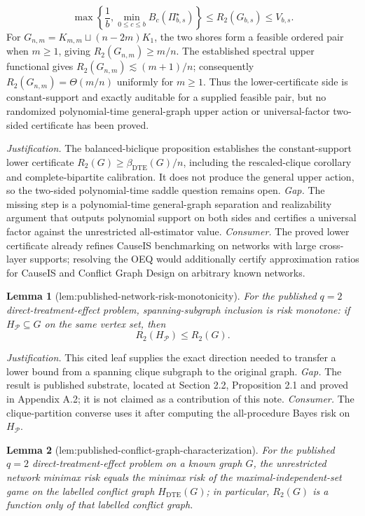 \documentclass{article}
\newtheorem{lemma}{Lemma}
\begin{document}
\[
\max\left\{
\frac1b,
\min_{0\leq c\leq b}B_c(\Pi_{b,s}^{\star})
\right\}
\leq R_2(G_{b,s})\leq V_{b,s}.
\]
For \(G_{n,m}=K_{m,m}\sqcup(n-2m)K_1\), the two shores form a feasible ordered pair when \(m\geq1\), giving \(R_2(G_{n,m})\geq m/n\).  The established spectral upper functional gives \(R_2(G_{n,m})\lesssim(m+1)/n\); consequently \(R_2(G_{n,m})=\Theta(m/n)\) uniformly for \(m\geq1\).  Thus the lower-certificate side is constant-support and exactly auditable for a supplied feasible pair, but no randomized polynomial-time general-graph upper action or universal-factor two-sided certificate has been proved.
\par\smallskip\noindent \textit{Justification.} The balanced-biclique proposition establishes the constant-support lower certificate \(R_2(G)\geq\beta_{\mathrm{DTE}}(G)/n\), including the rescaled-clique corollary and complete-bipartite calibration. It does not produce the general upper action, so the two-sided polynomial-time saddle question remains open. \textit{Gap.} The missing step is a polynomial-time general-graph separation and realizability argument that outputs polynomial support on both sides and certifies a universal factor against the unrestricted all-estimator value. \textit{Consumer.} The proved lower certificate already refines CauseIS benchmarking on networks with large cross-layer supports; resolving the OEQ would additionally certify approximation ratios for CauseIS and Conflict Graph Design on arbitrary known networks.

\begin{lemma}[lem:published-network-risk-monotonicity]\label{lem:published-network-risk-monotonicity}
For the published \(q=2\) direct-treatment-effect problem, spanning-subgraph inclusion is risk monotone: if \(H_{\mathcal P}\subseteq G\) on the same vertex set, then
\[
R_2(H_{\mathcal P})\leq R_2(G).
\]
\end{lemma}
\par\smallskip\noindent \textit{Justification.} This cited leaf supplies the exact direction needed to transfer a lower bound from a spanning clique subgraph to the original graph. \textit{Gap.} The result is published substrate, located at Section 2.2, Proposition 2.1 and proved in Appendix A.2; it is not claimed as a contribution of this note. \textit{Consumer.} The clique-partition converse uses it after computing the all-procedure Bayes risk on \(H_{\mathcal P}\).

\begin{lemma}[lem:published-conflict-graph-characterization]\label{lem:published-conflict-graph-characterization}
For the published \(q=2\) direct-treatment-effect problem on a known graph \(G\), the unrestricted network minimax risk equals the minimax risk of the maximal-independent-set game on the labelled conflict graph \(H_{\mathrm{DTE}}(G)\); in particular, \(R_2(G)\) is a function only of that labelled conflict graph.
\end{lemma}
\end{document}

